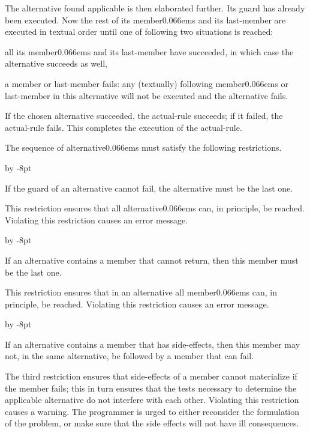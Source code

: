 \documentclass{article}
\newcommand\g[1]{{\color{blue!50!black}\sf #1}}
\renewenvironment{itemize}{\begin{list}{}{%
\advance\leftmargin by -8pt%
\setlength\itemsep{0ex plus 0.2ex}%
\setlength\partopsep{3pt}%
\setlength\topsep{2pt plus 2pt}%
\setlength\parsep{0pt plus 2pt}%
}}{\end{list}}
\renewcommand\/{\kern 0.066em}
\begin{document}
The \g{alternative} found applicable is then elaborated further. Its guard
has already been executed. Now the rest of its \g{member}\/s and its
\g{last-member} are executed in textual order until one of following 
two situations is reached:
\begin{list}{}{\setlength\topsep{2pt}%
\setlength\partopsep{3pt}%
\setlength{}%
\setlength{}%
\setlength{}%
\setlength\leftmargin{\parindent}}
\item[\emph{either} ] all its \g{member}\/s and its \g{last-member} have succeeded, 
in which case the \g{alternative} succeeds as well,
\item[\emph{or} ] a \g{member} or \g{last-member} fails: any (textually) following
\g{member}\/s 
or \g{last-member} in this
\g{alternative} will not be executed and the \g{alternative} fails.
\end{list}
If the chosen \g{alternative} succeeded, the \g{actual-rule} succeeds; if it
failed, the \g{actual-rule} fails. This completes the execution of the
\g{actual-rule}.

The sequence of \g{alternative}\/s must satisfy the following restrictions.
\begin{itemize}
\item[a)]
If the guard of an \g{alternative} cannot fail, the \g{alternative} must be
the last one.
\end{itemize}
This restriction ensures that all \g{alternative}\/s can, in principle, be
reached. Violating this restriction causes an error message.
\begin{itemize}
\item[b)]
If an \g{alternative} contains a \g{member} that cannot return, then this
\g{member} must be the last one.
\end{itemize}
This restriction ensures that in an \g{alternative} all \g{member}\/s can,
in principle, be reached. Violating this restriction causes an error
message.
\begin{itemize}
\item[c)]
If an \g{alternative} contains a \g{member} that has side-effects,
then this \g{member} may not, in the same \g{alternative},
be followed by a \g{member} that can fail.
\end{itemize}
The third restriction ensures that side-effects of a \g{member} cannot
materialize if the \g{member} fails; this in turn ensures that the tests
necessary to determine the applicable \g{alternative} do not interfere with
each other. Violating this restriction causes a warning. The programmer is
urged to either reconsider the formulation of the problem, or make sure that
the side effects will not have ill consequences.
\end{document}
